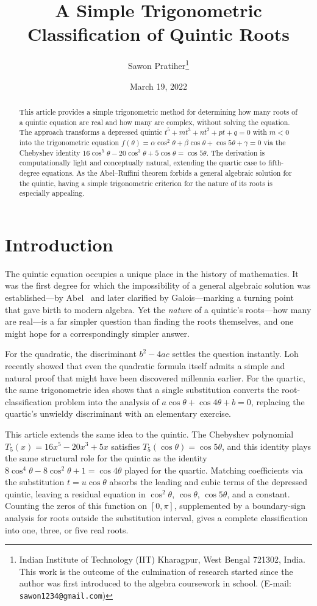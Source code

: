 \documentclass[12pt]{article}
\title{A Simple Trigonometric Classification of Quintic Roots}
\author{Sawon Pratiher\footnote{Indian Institute of Technology (IIT) Kharagpur, West Bengal 721302, India. This work is the outcome of the culmination of research started since the author was first introduced to the algebra coursework in school. (E-mail: \texttt{sawon1234@gmail.com})}}
\date{March 19, 2022}
\theoremstyle{definition}
\theoremstyle{remark}
\begin{document}
\maketitle

\begin{abstract}
This article provides a simple trigonometric method for determining how many roots of a quintic equation are real and how many are complex, without solving the equation. The approach transforms a depressed quintic $t^5 + mt^3 + nt^2 + pt + q = 0$ with $m < 0$ into the trigonometric equation $f(\theta) = \alpha\cos^2\!\theta + \beta\cos\theta + \cos 5\theta + \gamma = 0$ via the Chebyshev identity $16\cos^5\!\theta - 20\cos^3\!\theta + 5\cos\theta = \cos 5\theta$. The derivation is computationally light and conceptually natural, extending the quartic case to fifth-degree equations. As the Abel--Ruffini theorem forbids a general algebraic solution for the quintic, having a simple trigonometric criterion for the nature of its roots is especially appealing.
\end{abstract}

\section{Introduction}

The quintic equation occupies a unique place in the history of mathematics. It was the first degree for which the impossibility of a general algebraic solution was established---by Abel~\cite{Abel1824} and later clarified by Galois---marking a turning point that gave birth to modern algebra. Yet the \emph{nature} of a quintic's roots---how many are real---is a far simpler question than finding the roots themselves, and one might hope for a correspondingly simpler answer.

For the quadratic, the discriminant $b^2 - 4ac$ settles the question instantly. Loh~\cite{Loh2019} recently showed that even the quadratic formula itself admits a simple and natural proof that might have been discovered millennia earlier. For the quartic, the same trigonometric idea shows that a single substitution converts the root-classification problem into the analysis of $a\cos\theta + \cos 4\theta + b = 0$, replacing the quartic's unwieldy discriminant with an elementary exercise.

This article extends the same idea to the quintic. The Chebyshev polynomial $T_5(x) = 16x^5 - 20x^3 + 5x$ satisfies $T_5(\cos\theta) = \cos 5\theta$, and this identity plays the same structural role for the quintic as the identity $8\cos^4\!\theta - 8\cos^2\!\theta + 1 = \cos 4\theta$ played for the quartic. Matching coefficients via the substitution $t = u\cos\theta$ absorbs the leading and cubic terms of the depressed quintic, leaving a residual equation in $\cos^2\!\theta$, $\cos\theta$, $\cos 5\theta$, and a constant. Counting the zeros of this function on $[0,\pi]$, supplemented by a boundary-sign analysis for roots outside the substitution interval, gives a complete classification into one, three, or five real roots.
\end{document}
